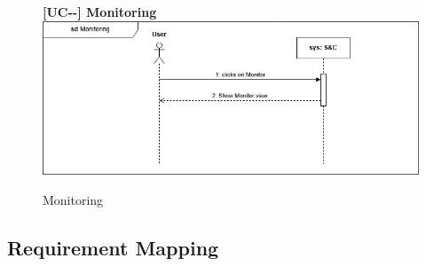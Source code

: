 \begin{figure}[H]
\textbf{[UC\nextUCDiagr-\nextUCDiagr-\nextUCDiagr] Monitoring}\newline\newline
    \includegraphics[width=15cm]{Images/UC_diagram/RASD-UC24.drawio.png}
    \caption{Monitoring}
\end{figure}
\subsection{Requirement Mapping}
